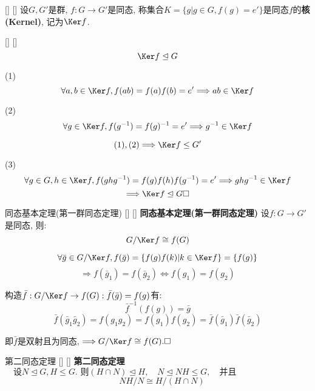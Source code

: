 \documentclass[UTF8]{ctexart}
\begin{document}
		\begin{dfn}
            []
            {}
            []
            []
			设$G,G'$是群, $f:G\to G'$是同态, 称集合$K=\{g|g\in G, f(g)=e'\}$是同态$f$的\textbf{核(Kernel)}, 记为$\Ker  f$. 
		\end{dfn}
		
		\begin{ppt}
            []
            {}
            []
            []
			\[\Ker f\trianglelefteq G\]
		\end{ppt}
  
		\begin{prf}
  
			(1)\[\forall a,b\in\Ker f, f(ab)=f(a)f(b)=e'\Longrightarrow ab\in\Ker f\]
			
			(2)\[\forall g\in\Ker f, f(g^{-1})=f(g)^{-1}=e'\Longrightarrow g^{-1}\in\Ker f\]
			
			\[(1),(2)\Longrightarrow \Ker f\leq G'\]
			
			(3)\[\forall g\in G, h\in\Ker f, f(ghg^{-1})=f(g)f(h)f(g^{-1})=e'\Longrightarrow ghg^{-1}\in\Ker f\]
			\[\Longrightarrow \Ker f\trianglelefteq G\square\]
		\end{prf}
  
		\begin{thm}
            []
            {同态基本定理(第一群同态定理)}
            []
            []
        \textbf{同态基本定理(第一群同态定理)}
			 设$f:G\to G'$是同态, 则: 
			\[G/\Ker f\cong f(G)\]
		\end{thm}

        \begin{prf}
			\[\forall \bar g\in G/\Ker f, f(\bar g)=\{f(g)f(k)|k\in\Ker f\}=\{f(g)\}\]
			\[\Longrightarrow f(\bar g_1)=f(\bar g_2)\iff f(g_1)=f(g_2)\]
			
			构造$\bar f: G/\Ker f\to f(G): \bar f(\bar g)=f(g)$有: 
			\[\bar f^{-1}(f(g))=\bar g\]
			\[\bar f(\bar g_1 \bar g_2)=f(g_1 g_2)=f(g_1)f(g_2)=\bar f(\bar g_1)\bar f(\bar g_2)\]
			
			即$\bar f$是双射且为同态, $\Longrightarrow G/\Ker f\cong f(G).\square$
		\end{prf}

        \begin{thm}
            []
            {第二同态定理}
            []
            []
        \textbf{第二同态定理}
        $\quad \text{设} N \trianglelefteq G, H \leq G.\text{  则}
        (H \cap N) \trianglelefteq H, \quad N \trianglelefteq NH \leq G, \quad \text{并且}$\\
        \[\quad NH/N \cong H/(H \cap N)\]

        \end{thm}
\end{document}

